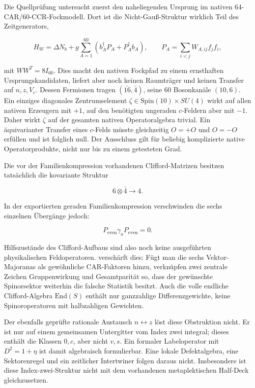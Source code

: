 Die Quellprüfung  untersucht zuerst den naheliegenden Ursprung im nativen 64-CAR/60-CCR-Fockmodell. Dort ist die Nicht-Gauß-Struktur wirklich Teil des Zeitgenerators,

\[
H_W=\Delta N_b+g\sum_{A=1}^{60}
\left(b_A^\dagger P_A+P_A^\dagger b_A\right),
\qquad P_A=\sum_{i<j}W_{A,ij}f_jf_i,
\]

mit \(WW^T=8I_{60}\). Dies macht den nativen Fockpfad zu einem ernsthaften Ursprungskandidaten, liefert aber noch keinen Raumträger und keinen Transfer auf \(n,z,V_c\). Dessen Fermionen tragen \((\bar{16},\bar4)\), seine 60 Bosonkanäle \((10,6)\). Ein einziges diagonales Zentrumselement \(\zeta\in\mathrm{Spin}(10)\times SU(4)\) wirkt auf allen nativen Erzeugern mit \(+1\), auf den benötigten ungeraden \(c\)-Feldern aber mit \(-1\). Daher wirkt \(\zeta\) auf der gesamten nativen Operatoralgebra trivial. Ein äquivarianter Transfer eines \(c\)-Felds müsste gleichzeitig \(O=+O\) und \(O=-O\) erfüllen und ist folglich null. Der Ausschluss gilt für beliebig komplizierte native Operatorprodukte, nicht nur bis zu einem getesteten Grad.

Die vor der Familienkompression vorhandenen Clifford-Matrizen besitzen tatsächlich die kovariante Struktur

\[
6\otimes\bar4\longrightarrow4.
\]

In der exportierten geraden Familienkompression verschwinden die sechs einzelnen Übergänge jedoch:

\[
P_\mathrm{even}\gamma_aP_\mathrm{even}=0.
\]

Hilfszustände des Clifford-Aufbaus sind also noch keine ausgeführten physikalischen Feldoperatoren.  verschärft dies: Fügt man die sechs Vektor-Majoranas als gewöhnliche CAR-Faktoren hinzu, verknüpfen zwei zentrale Zeichen Gruppenwirkung und Gesamtparität so, dass der gewünschte Spinorsektor weiterhin die falsche Statistik besitzt. Auch die volle endliche Clifford-Algebra \(\mathrm{End}(S)\) enthält nur ganzzahlige Differenzgewichte, keine Spinoroperatoren mit halbzahligen Gewichten.

Der ebenfalls geprüfte rationale Austausch \(n\leftrightarrow z\) löst diese Obstruktion nicht. Er ist nur auf einem gemeinsamen Untergitter vom Index zwei integral; dieses enthält die Klassen \(0,c\), aber nicht \(v,s\). Ein formaler Labeloperator mit \(D^2=1+\eta\) ist damit algebraisch formulierbar. Eine lokale Defektalgebra, eine Sektorenregel und ein zeitlicher Intertwiner folgen daraus nicht. Insbesondere ist diese Index-zwei-Struktur nicht mit dem vorhandenen metaplektischen Half-Deck gleichzusetzen. 

